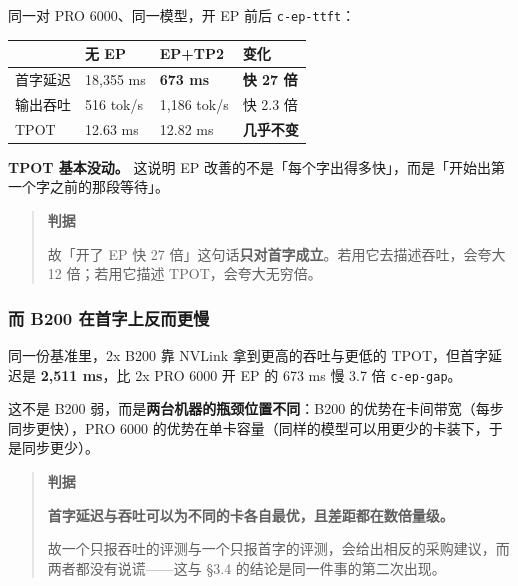 同一对 PRO 6000、同一模型，开 EP 前后 {\scriptsize\texttt{c-\hspace{0pt}ep-\hspace{0pt}ttft}}：


\begin{table}[t]
\centering
\footnotesize
\setlength{\tabcolsep}{4pt}
\label{tab:11}
\begin{tabular}{llll}
\toprule
 & 无 EP & EP+TP2 & 变化 \\
\midrule
首字延迟 & 18,355 ms & \textbf{673 ms} & \textbf{快 27 倍} \\
输出吞吐 & 516 tok/s & 1,186 tok/s & 快 2.3 倍 \\
TPOT & 12.63 ms & 12.82 ms & \textbf{几乎不变} \\
\bottomrule
\end{tabular}
\end{table}

\textbf{TPOT 基本没动。} 这说明 EP 改善的不是「每个字出得多快」，而是「开始出第一个字之前的那段等待」。


\begin{quote}\small
\textbf{ 判据}

故「开了 EP 快 27 倍」这句话\textbf{只对首字成立}。若用它去描述吞吐，会夸大 12 倍；若用它描述 TPOT，会夸大无穷倍。

\end{quote}

\subsubsection{而 B200 在首字上反而更慢}

同一份基准里，2x B200 靠 NVLink 拿到更高的吞吐与更低的 TPOT，但首字延迟是 \textbf{2,511 ms}，比 2x PRO 6000 开 EP 的 673 ms 慢 3.7 倍 {\scriptsize\texttt{c-\hspace{0pt}ep-\hspace{0pt}gap}}。


 这不是 B200 弱，而是\textbf{两台机器的瓶颈位置不同}：B200 的优势在卡间带宽（每步同步更快），PRO 6000 的优势在单卡容量（同样的模型可以用更少的卡装下，于是同步更少）。


\begin{quote}\small
\textbf{ 判据}

\textbf{首字延迟与吞吐可以为不同的卡各自最优，且差距都在数倍量级。}

故一个只报吞吐的评测与一个只报首字的评测，会给出相反的采购建议，而两者都没有说谎——这与 §3.4 的结论是同一件事的第二次出现。

\end{quote}

